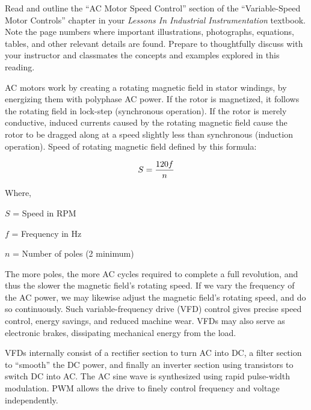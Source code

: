 

Read and outline the ``AC Motor Speed Control'' section of the ``Variable-Speed Motor Controls'' chapter in your {\it Lessons In Industrial Instrumentation} textbook.  Note the page numbers where important illustrations, photographs, equations, tables, and other relevant details are found.  Prepare to thoughtfully discuss with your instructor and classmates the concepts and examples explored in this reading.














AC motors work by creating a rotating magnetic field in stator windings, by energizing them with polyphase AC power.  If the rotor is magnetized, it follows the rotating field in lock-step (synchronous operation).  If the rotor is merely conductive, induced currents caused by the rotating magnetic field cause the rotor to be dragged along at a speed slightly less than synchronous (induction operation).  Speed of rotating magnetic field defined by this formula:

$$S = {120 f \over n}$$

\noindent
Where,

$S$ = Speed in RPM

$f$ = Frequency in Hz

$n$ = Number of poles (2 minimum)

\vskip 10pt

The more poles, the more AC cycles required to complete a full revolution, and thus the slower the magnetic field's rotating speed.  If we vary the frequency of the AC power, we may likewise adjust the magnetic field's rotating speed, and do so continuously.  Such variable-frequency drive (VFD) control gives precise speed control, energy savings, and reduced machine wear.  VFDs may also serve as electronic brakes, dissipating mechanical energy from the load.

\vskip 10pt

VFDs internally consist of a rectifier section to turn AC into DC, a filter section to ``smooth'' the DC power, and finally an inverter section using transistors to switch DC into AC.  The AC sine wave is synthesized using rapid pulse-width modulation.  PWM allows the drive to finely control frequency and voltage independently.

